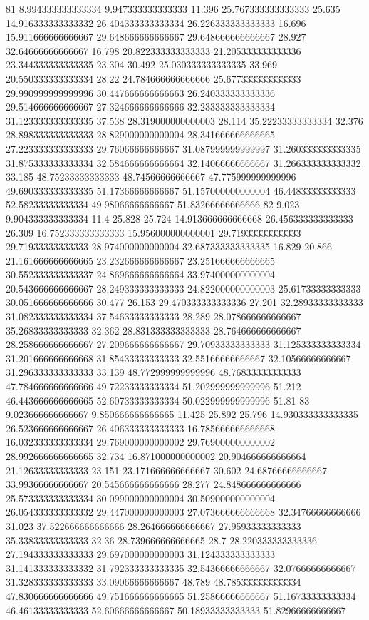 81 8.994333333333334 9.947333333333333 11.396 25.767333333333333 25.635 14.916333333333332 26.404333333333334 26.226333333333333 16.696 15.911666666666667 29.648666666666667 29.648666666666667 28.927 32.64666666666667 16.798 20.822333333333333 21.205333333333336 23.344333333333335 23.304 30.492 25.030333333333335 33.969 20.550333333333334 28.22 24.784666666666666 25.677333333333333 29.990999999999996 30.447666666666663 26.240333333333336 29.514666666666667 27.324666666666666 32.233333333333334 31.123333333333335 37.538 28.319000000000003 28.114 35.22233333333334 32.376 28.898333333333333 28.829000000000004 28.341666666666665 27.223333333333333 29.76066666666667 31.087999999999997 31.260333333333335 31.875333333333334 32.584666666666664 32.14066666666667 31.266333333333332 33.185 48.75233333333333 48.74566666666667 47.775999999999996 49.690333333333335 51.17366666666667 51.157000000000004 46.44833333333333 52.58233333333334 49.98066666666667 51.83266666666666
82 9.023 9.904333333333334 11.4 25.828 25.724 14.913666666666668 26.456333333333333 26.309 16.752333333333333 15.956000000000001 29.71933333333333 29.71933333333333 28.974000000000004 32.687333333333335 16.829 20.866 21.161666666666665 23.232666666666667 23.251666666666665 30.552333333333337 24.869666666666664 33.974000000000004 20.543666666666667 28.249333333333333 24.822000000000003 25.61733333333333 30.051666666666666 30.477 26.153 29.470333333333336 27.201 32.28933333333333 31.082333333333334 37.54633333333333 28.289 28.078666666666667 35.26833333333333 32.362 28.831333333333333 28.764666666666667 28.258666666666667 27.209666666666667 29.70933333333333 31.125333333333334 31.201666666666668 31.85433333333333 32.55166666666667 32.10566666666667 31.296333333333333 33.139 48.772999999999996 48.76833333333333 47.784666666666666 49.72233333333334 51.202999999999996 51.212 46.443666666666665 52.60733333333334 50.022999999999996 51.81
83 9.023666666666667 9.850666666666665 11.425 25.892 25.796 14.930333333333335 26.523666666666667 26.406333333333333 16.785666666666668 16.032333333333334 29.769000000000002 29.769000000000002 28.992666666666665 32.734 16.871000000000002 20.904666666666664 21.12633333333333 23.151 23.171666666666667 30.602 24.68766666666667 33.99366666666667 20.545666666666666 28.277 24.848666666666666 25.573333333333334 30.099000000000004 30.509000000000004 26.054333333333332 29.447000000000003 27.073666666666668 32.34766666666666 31.023 37.522666666666666 28.264666666666667 27.95933333333333 35.33833333333333 32.36 28.739666666666665 28.7 28.220333333333336 27.194333333333333 29.697000000000003 31.124333333333333 31.141333333333332 31.792333333333335 32.54366666666667 32.07666666666667 31.328333333333333 33.09066666666667 48.789 48.785333333333334 47.830666666666666 49.751666666666665 51.25866666666667 51.16733333333334 46.46133333333333 52.60666666666667 50.18933333333333 51.82966666666667
